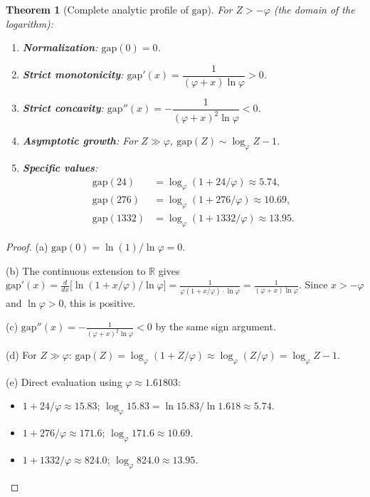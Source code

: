 \documentclass[11pt,a4paper]{article}
\newtheorem{theorem}{Theorem}[section]
\theoremstyle{definition}
\theoremstyle{remark}
\newcommand{\phig}{\varphi}
\newcommand{\Zidx}{Z}
\begin{document}
\begin{theorem}[Complete analytic profile of $\mathrm{gap}$]
\label{thm:gap_analytic}
For $\Zidx > -\phig$ (the domain of the logarithm):
\begin{enumerate}[label=(\alph*)]
  \item \textbf{Normalization}: $\mathrm{gap}(0) = 0$.
  \item \textbf{Strict monotonicity}:
    $\mathrm{gap}'(x) = \dfrac{1}{(\phig + x)\ln\phig} > 0$.
  \item \textbf{Strict concavity}:
    $\mathrm{gap}''(x) = -\dfrac{1}{(\phig + x)^2 \ln\phig} < 0$.
  \item \textbf{Asymptotic growth}: For $\Zidx \gg \phig$,
    $\mathrm{gap}(\Zidx) \sim \log_\phig \Zidx - 1$.
  \item \textbf{Specific values}:
    \begin{align*}
      \mathrm{gap}(24)   &= \log_\phig(1 + 24/\phig) \approx 5.74, \\
      \mathrm{gap}(276)  &= \log_\phig(1 + 276/\phig) \approx 10.69, \\
      \mathrm{gap}(1332) &= \log_\phig(1 + 1332/\phig) \approx 13.95.
    \end{align*}
\end{enumerate}
\end{theorem}

\begin{proof}
(a) $\mathrm{gap}(0) = \ln(1)/\ln\phig = 0$.

(b) The continuous extension to $\mathbb{R}$ gives
$\mathrm{gap}'(x) = \frac{d}{dx}\bigl[\ln(1 + x/\phig)/\ln\phig\bigr]
= \frac{1}{\phig(1 + x/\phig) \cdot \ln\phig}
= \frac{1}{(\phig + x)\ln\phig}$.
Since $x > -\phig$ and $\ln\phig > 0$, this is positive.

(c) $\mathrm{gap}''(x) = -\frac{1}{(\phig + x)^2 \ln\phig} < 0$ by the
same sign argument.

(d) For $\Zidx \gg \phig$:
$\mathrm{gap}(\Zidx) = \log_\phig(1 + \Zidx/\phig)
\approx \log_\phig(\Zidx/\phig) = \log_\phig\Zidx - 1$.

(e) Direct evaluation using $\phig \approx 1.61803$:
\begin{itemize}[nosep]
  \item $1 + 24/\phig \approx 15.83$;\;
        $\log_\phig 15.83 = \ln 15.83/\ln 1.618 \approx 5.74$.
  \item $1 + 276/\phig \approx 171.6$;\;
        $\log_\phig 171.6 \approx 10.69$.
  \item $1 + 1332/\phig \approx 824.0$;\;
        $\log_\phig 824.0 \approx 13.95$.
\end{itemize}
\vspace{-1.5em}
\end{proof}
\end{document}
